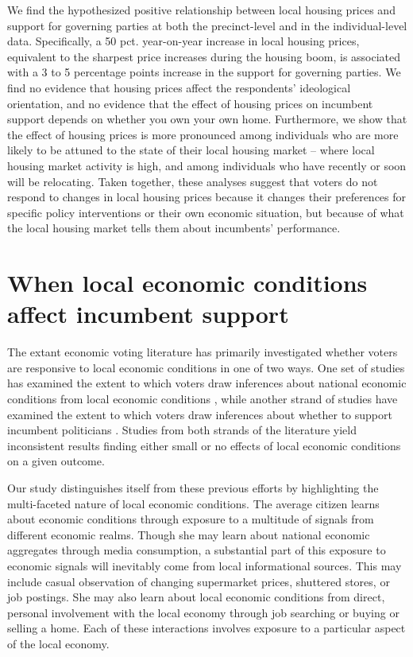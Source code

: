 \documentclass[12pt,a4paper]{article}
\begin{document}
	We find the hypothesized positive relationship between local housing prices and support for governing parties at both the precinct-level and in the individual-level data. Specifically, a 50 pct. year-on-year increase in local housing prices, equivalent to the sharpest price increases during the housing boom, is associated with a 3 to 5 percentage points increase in the support for governing parties. We find no evidence that housing prices affect the respondents’ ideological orientation, and no evidence that the effect of housing prices on incumbent support depends on whether you own your own home. Furthermore, we show that the effect of housing prices is more pronounced among individuals who are more likely to be attuned to the state of their local housing market -- where local housing market activity is high, and among individuals who have recently or soon will be relocating. Taken together, these analyses suggest that voters do not respond to changes in local housing prices because it changes their preferences for specific policy interventions or their own economic situation, but because of what the local housing market tells them about incumbents' performance.
	
	\section{When local economic conditions affect incumbent support}
	
	The extant economic voting literature has primarily investigated whether voters are responsive to local economic conditions in one of two ways. One set of studies has examined the extent to which voters draw inferences about national economic conditions from local economic conditions \citep{books1999contextual,reeves2012ecologies,anderson2011local,ansolabehere2014mecro,bisgaard2016reconsidering}, while another strand of studies have examined the extent to which voters draw inferences about whether to support incumbent politicians  \citep{hansford2015reevaluating,eisenberg2004economic,kim2003spatial,healy2017presidential, hall2017economic,elinder2010local,auberger2005influence}. Studies from both strands of the literature yield inconsistent results finding either small or no effects of local economic conditions on a given outcome.   
	
	Our study distinguishes itself from these previous efforts by highlighting the multi-faceted nature of local economic conditions. The average citizen learns about economic conditions through exposure to a multitude of signals from different economic realms. Though she may learn about national economic aggregates through media consumption, a substantial part of this exposure to economic signals will inevitably come from local informational sources. This may include casual observation of changing supermarket prices, shuttered stores, or job postings. She may also learn about local economic conditions from direct, personal involvement with the local economy through job searching or buying or selling a home. Each of these interactions involves exposure to a particular aspect of the local economy.
	
\end{document}
